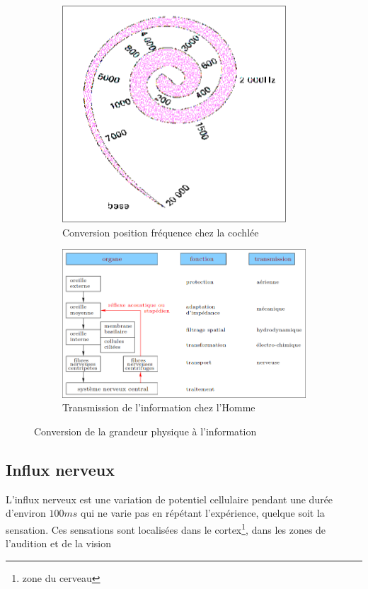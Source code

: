 \begin{figure}[hbt!]
    \begin{subfigure}{.5\textwidth}
      \centering
      \includegraphics[width=.45\linewidth]{Pics/conv_position_freq.png}
      \caption{Conversion position fréquence chez la cochlée}
      \label{fig:sfig1}
    \end{subfigure}%
    \begin{subfigure}{.5\textwidth}
      \centering
      \includegraphics[width=.7\linewidth]{Pics/Transmission_Information_chez_lH.png}
      \caption{Transmission de l'information chez l'Homme}
      \label{fig:sfig2}
    \end{subfigure}
    \caption{Conversion de la grandeur physique à l'information}
    \label{fig:fig}
\end{figure}
\subsection{Influx nerveux}
L'influx nerveux est une variation de potentiel cellulaire pendant une durée d'environ $100ms$ qui ne varie pas en répétant l'expérience, quelque soit la sensation. Ces sensations sont localisées dans le cortex\footnote{zone du cerveau}, dans les zones de l'audition et de la vision
\newpage
